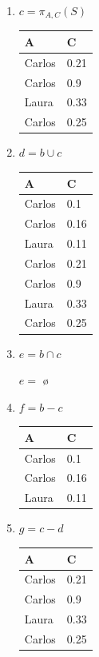 \documentclass{article}
\begin{document}
\begin{enumerate}
\begin{enumerate}
        
        \item $c = \pi_{A,C}(S)$
        
        \begin{tabular}{|l|l|}
        \hline
            A      & C    \\ \hline
            Carlos & 0.21 \\ \hline
            Carlos & 0.9  \\ \hline
            Laura  & 0.33 \\ \hline
            Carlos & 0.25 \\ \hline
        \end{tabular}
        
        \item $d = b \cup c$
        
        \begin{tabular}{|l|l|}
        \hline
            A      & C    \\ \hline
            Carlos & 0.1  \\ \hline
            Carlos & 0.16 \\ \hline
            Laura  & 0.11 \\ \hline
            Carlos & 0.21 \\ \hline
            Carlos & 0.9  \\ \hline
            Laura  & 0.33 \\ \hline
            Carlos & 0.25 \\ \hline
        \end{tabular}
        
        \item $e = b \cap c$
        
        $e =$ \o
        
        \item $f = b-c$
        
        \begin{tabular}{|l|l|}
        \hline
            A      & C    \\ \hline
            Carlos & 0.1  \\ \hline
            Carlos & 0.16 \\ \hline
            Laura  & 0.11 \\ \hline
        \end{tabular}
        
        \item $g = c-d$
        
        \begin{tabular}{|l|l|}
        \hline
            A      & C    \\ \hline
            Carlos & 0.21 \\ \hline
            Carlos & 0.9  \\ \hline
            Laura  & 0.33 \\ \hline
            Carlos & 0.25 \\ \hline
        \end{tabular}
        

\end{enumerate}
\end{enumerate}
\end{document}
